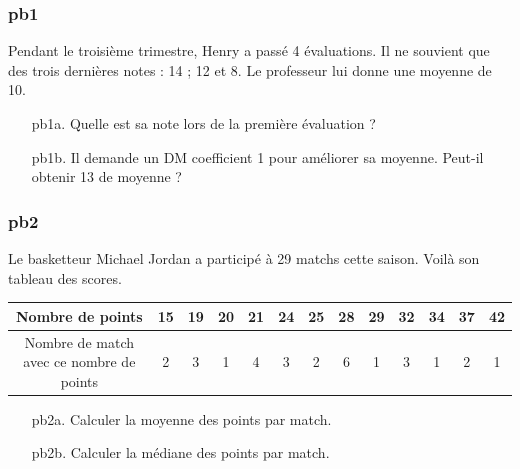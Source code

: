 \subsubsection*{pb1}

Pendant le troisième trimestre, Henry a passé 4 évaluations. Il ne souvient que des trois dernières notes : 14 ; 12 et 8. Le professeur lui donne une moyenne de 10. 

\begin{enumerate}
  \item[pb1a.] Quelle est sa note lors de la première évaluation ? 
  \item[pb1b.] Il demande un DM coefficient 1 pour améliorer sa moyenne. Peut-il obtenir 13 de moyenne ?
\end{enumerate}

\Pointilles[8]

\subsubsection*{pb2}

Le basketteur Michael Jordan a participé à 29 matchs cette saison. Voilà son tableau des scores.

\begin{tabular}{|c|c|c|c|c|c|c|c|c|c|c|c|c|}
  \hline
  Nombre de points                         & 15 & 19 & 20 & 21 & 24 & 25 & 28 & 29 & 32 & 34 & 37 & 42 \\ \hline

  Nombre de match avec ce nombre de points & 2  & 3  & 1  & 4  &  3 & 2  & 6  & 1  & 3  & 1  & 2  & 1  \\ \hline
\end{tabular}

\begin{enumerate}
  \item[pb2a.] Calculer la moyenne des points par match.
  \item[pb2b.] Calculer la médiane des points par match.
\end{enumerate}

\Pointilles[8]




